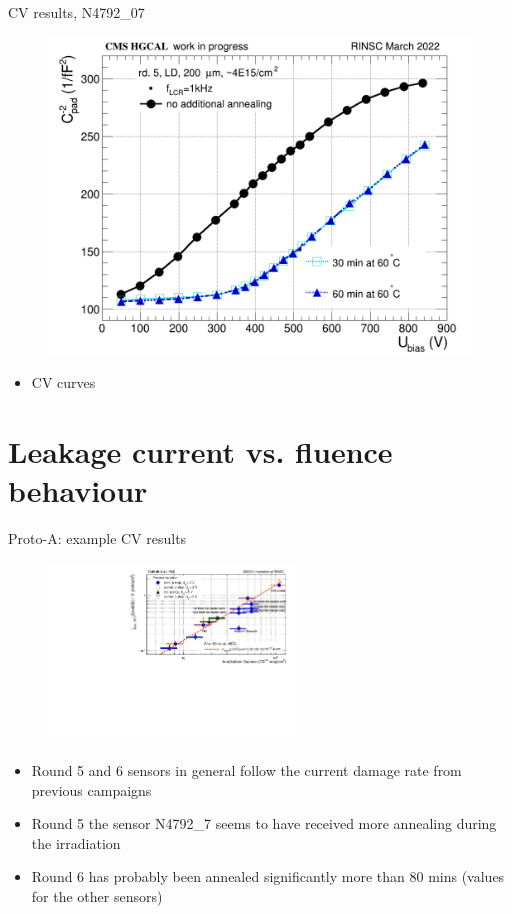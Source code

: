 \documentclass{beamer}
\begin{document}
\begin{frame}{CV results, N4792\_07}
  \begin{figure}
      \includegraphics[width=.7\textwidth]{plots/annealing_CV_ch101_N4792_7.png}    
  \end{figure}
  \begin{itemize}
    \item CV curves
  \end{itemize}
\end{frame}


\section{Leakage current vs. fluence behaviour}

\begin{frame}{Proto-A: example CV results}
  \begin{figure}
      \includegraphics[width=0.6\textwidth]{plots/alpha_600V.pdf}    
  \end{figure}
  \begin{itemize}
    \item Round 5 and 6 sensors in general follow the current damage rate from previous campaigns
    \item Round 5 the sensor N4792\_7 seems to have received more annealing during the irradiation
    \item Round 6 has probably been annealed significantly more than 80 mins (values for the other sensors)
  \end{itemize}
\end{frame}
\end{document}
